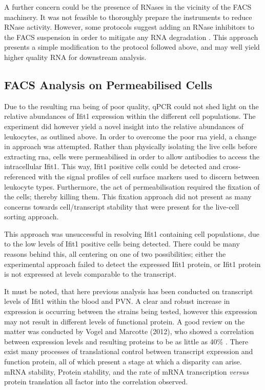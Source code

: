 A further concern could be the presence of RNases in the vicinity of the FACS machinery. It was not feasible to thoroughly prepare the instruments to reduce RNase activity. However, some protocols suggest adding an RNase inhibitors to the FACS suspension in order to mitigate any RNA degradation \cite{Barrett2002}. This approach presents a simple modification to the protocol followed above, and may well yield higher quality RNA for downstream analysis. 

\subsection{FACS Analysis on Permeabilised Cells}

Due to the resulting \acrshort{rna} being of poor quality, qPCR could not shed light on the relative abundances of Ifit1 expression within the different cell populations. The experiment did however yield a novel insight into the relative abundances of leukocytes, as outlined above. In order to overcome the poor \acrshort{rna} yield, a change in approach was attempted. Rather than physically isolating the live cells before extracting \acrshort{rna}, cells were permeabilised in order to allow antibodies to access the intracellular Ifit1. This way, Ifit1 positive cells could be detected and cross-referenced with the signal profiles of cell surface markers used to discern between leukocyte types. Furthermore, the act of permeabilisation required the fixation of the cells; thereby killing them. This fixation approach did not present as many concerns towards cell/transcript stability that were present for the live-cell sorting approach.

This approach was unsuccessful in resolving Ifit1 containing cell populations, due to the low levels of Ifit1 positive cells being detected. There could be many reasons behind this, all centering on one of two possibilities; either the experimental approach failed to detect the expressed Ifit1 protein, or Ifit1 protein is not expressed at levels comparable to the transcript.

It must be noted, that here previous analysis has been conducted on transcript levels of Ifit1 within the blood and PVN. A clear and robust increase in expression is occurring between the strains being tested, however this expression may not result in different levels of functional protein. A good review on the matter was conducted by Vogel and Marcotte (2012), who showed a correlation between expression levels and resulting proteins to be as little as 40\% \cite{Vogel2012}. There exist many processes of translational control between transcript expression and function protein, all of which present a stage at which a disparity can arise. mRNA stability, Protein stability, and the rate of mRNA transcription \textit{versus} protein translation all factor into the correlation observed. 

